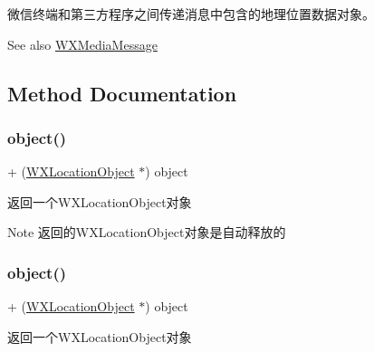 微信终端和第三方程序之间传递消息中包含的地理位置数据对象。 \begin{DoxySeeAlso}{See also}
\mbox{\hyperlink{interface_w_x_media_message}{W\+X\+Media\+Message}} 
\end{DoxySeeAlso}


\subsection{Method Documentation}
\mbox{\label{interface_w_x_location_object_ad42a7781455ce3515267360bc029e384}} 
\subsubsection{\texorpdfstring{object()}{object()}\hspace{0.1cm}{\footnotesize\ttfamily [1/3]}}
{\footnotesize\ttfamily + (\mbox{\hyperlink{interface_w_x_location_object}{W\+X\+Location\+Object}} $\ast$) object \begin{DoxyParamCaption}{ }\end{DoxyParamCaption}}



返回一个\+W\+X\+Location\+Object对象 

\begin{DoxyNote}{Note}
返回的\+W\+X\+Location\+Object对象是自动释放的 
\end{DoxyNote}
\mbox{\label{interface_w_x_location_object_ad42a7781455ce3515267360bc029e384}} 
\subsubsection{\texorpdfstring{object()}{object()}\hspace{0.1cm}{\footnotesize\ttfamily [2/3]}}
{\footnotesize\ttfamily + (\mbox{\hyperlink{interface_w_x_location_object}{W\+X\+Location\+Object}} $\ast$) object \begin{DoxyParamCaption}{ }\end{DoxyParamCaption}}



返回一个\+W\+X\+Location\+Object对象 

